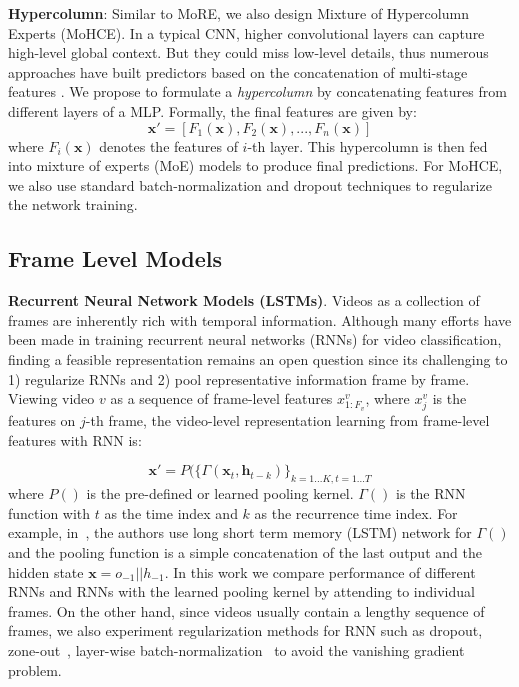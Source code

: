 \documentclass[10pt,twocolumn,letterpaper]{article}
\begin{document}
\textbf{Hypercolumn}:
Similar to MoRE, we also design Mixture of Hypercolumn Experts (MoHCE). In a typical CNN, higher convolutional layers can capture high-level global context. But they could miss low-level details, thus numerous approaches have built predictors based on the concatenation of multi-stage features \cite{bansal2017pixelnet} \cite{lin2016feature}. We propose to formulate a \textit{hypercolumn} by concatenating features from different layers of a MLP. Formally, the final features are given by:
\begin{equation}
    \mathbf{x'} = [F_1(\mathbf{x}), F_2(\mathbf{x}), ..., F_n(\mathbf{x})]
\end{equation}
where $F_i(\mathbf{x})$ denotes the features of $i$-th layer. This hypercolumn is then fed into mixture of experts (MoE) models to produce final predictions. For MoHCE, we also use standard batch-normalization and dropout techniques to regularize the network training. 


\subsection{Frame Level Models}
\textbf{Recurrent Neural Network Models (LSTMs)}. Videos as a collection of frames are inherently rich with temporal information. 
Although many efforts have been made in training recurrent neural networks (RNNs) for video classification, finding a feasible representation remains an open question since its challenging to 1) regularize RNNs and 2) pool representative information frame by frame. Viewing video $v$ as a sequence of frame-level features $x_{1:F_v}^v$, where $x_j^v$ is the features on $j$-th frame, the video-level representation learning from frame-level features with RNN is:

\begin{equation}
\mathbf{x}'=P(\{\Gamma(\mathbf{x}_t,\mathbf{h}_{t-k})\}_{k=1...K,t=1...T}\label{eq:frame_level}
\end{equation}
where $P()$ is the pre-defined or learned pooling kernel. $\Gamma()$ is the RNN function with $t$ as the time index and $k$ as the recurrence time index. For example, in~\cite{yt8m}, the authors use long short term memory (LSTM) network for $\Gamma()$ and the pooling function is a simple concatenation of the last output and the hidden state  $\mathbf{x}=o_{-1}||h_{-1}$. In this work we compare performance of different RNNs and RNNs with the learned pooling kernel by attending to individual frames. On the other hand, since videos usually contain a lengthy sequence of frames, we also experiment regularization methods for RNN such as dropout, zone-out~\cite{krueger2016zoneout}, layer-wise batch-normalization~\cite{cooijmans2016recurrent} to avoid the vanishing gradient problem.   
\end{document}
